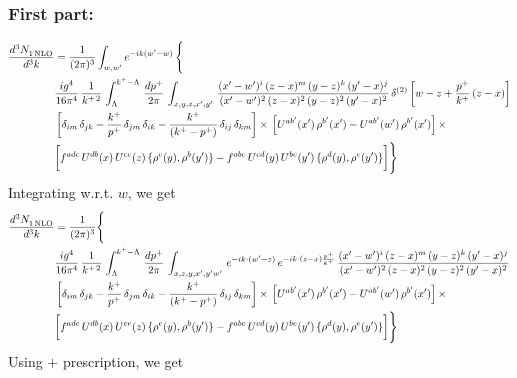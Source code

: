 \documentclass[9pt]{article}
\numberwithin{equation}{section}
\begin{document}
\subsubsection{First part:}
\begin{align}
    \frac{d^{3}N_{1\,\rm NLO}^{\rm}}{d^{3}k}  & = \frac{1}{(2\pi)^{3}}  \int_{w, w^\prime} e^{-ik(w^\prime-w)}\, \Bigg\{\notag \\ & \frac{ig^{4}}{16\pi^{4}}\, \frac{1}{k^{+\,2}}\,\int_{\Lambda}^{k^{+}-\Lambda}\, \frac{dp^{+}}{2\pi}\,\int_{x,y,z,x',y'}\,\frac{(x'-w')^{i}\,(z-x)^{m}\,(y-z)^{k}\,(y'-x)^{j}}{(x'-w')^{2}\,(z-x)^{2}\,(y-z)^{2}\,(y'-x)^{2}}\, \delta^{(2)}\left[w-z+\frac{p^{+}}{k^{+}}\,(z-x)\right]\notag \\ & \left[\delta_{im}\,\delta_{jk}-\frac{k^{+}}{p^{+}}\, \delta_{jm}\,\delta_{ik}-\frac{k^{+}}{(k^{+}-p^{+})}\, \delta_{ij}\,\delta_{km}\right]\times\, \left[U^{ab'}(x')\,\rho^{b'}(x')-U^{ab'}(w')\,\rho^{b'}(x')\right]\times\notag \\ & \bigg[f^{adc}\,U^{db}(x)\,U^{ce}(z)\, \{\rho^{e}(y),\rho^{b}(y')\}-f^{abc}\,U^{cd}(y)\,U^{be}(y')\, \{\rho^{d}(y),\rho^{e}(y')\}\bigg]\Bigg\}
\end{align}
Integrating w.r.t. $w$, we get
\begin{align}
     \frac{d^{3}N_{1\,\rm NLO}^{\rm}}{d^{3}k}  & = \frac{1}{(2\pi)^{3}} \Bigg\{\notag \\ &  \frac{ig^{4}}{16\pi^{4}}\, \frac{1}{k^{+\,2}}\,\int_{\Lambda}^{k^{+}-\Lambda}\, \frac{dp^{+}}{2\pi}\,\int_{x,z,y,x',y'w'}\,e^{-ik\cdot (w^\prime-z)}\,e^{-ik\cdot (z-x)\frac{p^{+}}{k^{+}}}\,\frac{(x'-w')^{i}\,(z-x)^{m}\,(y-z)^{k}\,(y'-x)^{j}}{(x'-w')^{2}\,(z-x)^{2}\,(y-z)^{2}\,(y'-x)^{2}}\,\notag \\ & \left[\delta_{im}\,\delta_{jk}-\frac{k^{+}}{p^{+}}\, \delta_{jm}\,\delta_{ik}-\frac{k^{+}}{(k^{+}-p^{+})}\, \delta_{ij}\,\delta_{km}\right]\times\, \left[U^{ab'}(x')\,\rho^{b'}(x')-U^{ab'}(w')\,\rho^{b'}(x')\right]\times\notag \\ & \bigg[f^{adc}\,U^{db}(x)\,U^{ce}(z)\, \{\rho^{e}(y),\rho^{b}(y')\}-f^{abc}\,U^{cd}(y)\,U^{be}(y')\, \{\rho^{d}(y),\rho^{e}(y')\}\bigg]\Bigg\}
\end{align}
Using $+$ prescription, we get
\end{document}

